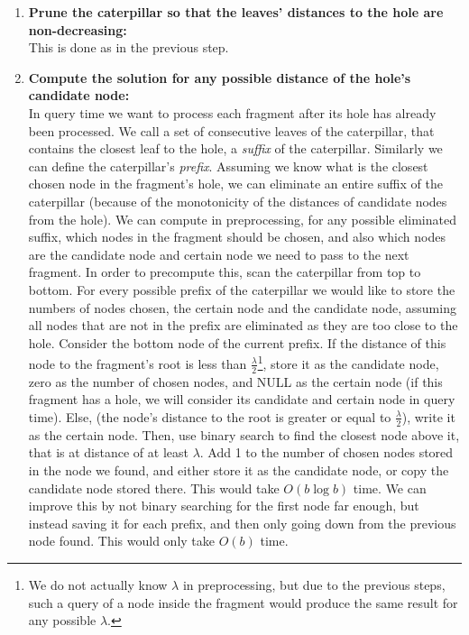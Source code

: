 \documentclass[11pt,a4paper]{article}
\theoremstyle{definition}
\theoremstyle{remark}
\begin{document}
\begin{enumerate}
\item \label{making distances from the hole monotone}
\textbf{Prune the caterpillar so that the leaves' distances to the hole are non-decreasing:}\\
This is done as in the previous step.
\item\textbf{Compute the solution for any possible distance of the hole's candidate node:}\\
In query time we want to process each fragment after its hole has already been processed.
We call a set of consecutive leaves of the caterpillar, that contains the closest leaf to the hole, a \emph{suffix} of the caterpillar. Similarly we can define the caterpillar's \emph{prefix}.
Assuming we know what is the closest chosen node in the fragment's hole, we can eliminate an entire suffix of the caterpillar (because of the monotonicity of the distances of candidate nodes from the hole). We can compute in preprocessing, for any possible eliminated suffix, which nodes in the fragment should be chosen, and also which nodes are the candidate node and certain node we need to pass to the next fragment.
In order to precompute this, scan the caterpillar from top to bottom. For every possible prefix of the caterpillar we would like to store the numbers of nodes chosen, the certain node and the candidate node, assuming all nodes that are not in the prefix are eliminated as they are too close to the hole. Consider the bottom node of the current prefix. If the distance of this node to the fragment's root is less than $\frac{\lambda}{2}$\footnote{We do not actually know $\lambda$ in preprocessing, but due to the previous steps, such a query of a node inside the fragment would produce the same result for any possible $\lambda$.}, store it as the candidate node, zero as the number of chosen nodes, and NULL as the certain node (if this fragment has a hole, we will consider its candidate and certain node in query time). Else, (the node's distance to the root is greater or equal to $\frac{\lambda}{2}$), write it as the certain node. Then, use binary search to find the closest node above it, that is at distance of at least $\lambda$. Add 1 to the number of chosen nodes stored in the node we found, and either store it as the candidate node, or copy the candidate node stored there. This would take $O(b \log b)$ time. We can improve this by not binary searching for the first node far enough, but instead saving it for each prefix, and then only going down from the previous node found. This would only take $O(b)$ time.
\end{enumerate}
\end{document}
